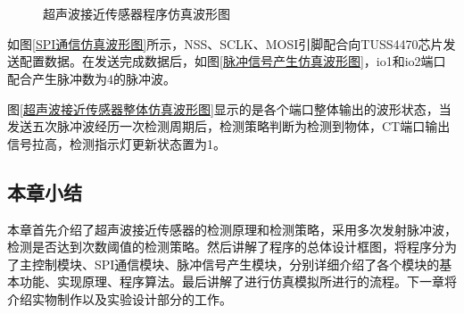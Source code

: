 \begin{figure}[ht]
	\centering
	\\
	\centering
	\\
	
	\caption{超声波接近传感器程序仿真波形图}
	\label{超声波接近传感器程序仿真波形图}
\end{figure}


如图\ref{SPI通信仿真波形图}所示，NSS、SCLK、MOSI引脚配合向TUSS4470芯片发送配置数据。在发送完成数据后，如图\ref{脉冲信号产生仿真波形图}，io1和io2端口配合产生脉冲数为4的脉冲波。\par
图\ref{超声波接近传感器整体仿真波形图}显示的是各个端口整体输出的波形状态，当发送五次脉冲波经历一次检测周期后，检测策略判断为检测到物体，CT端口输出信号拉高，检测指示灯更新状态置为1。\par
\subsection{本章小结}
本章首先介绍了超声波接近传感器的检测原理和检测策略，采用多次发射脉冲波，检测是否达到次数阈值的检测策略。然后讲解了程序的总体设计框图，将程序分为了主控制模块、SPI通信模块、脉冲信号产生模块，分别详细介绍了各个模块的基本功能、实现原理、程序算法。最后讲解了进行仿真模拟所进行的流程。下一章将介绍实物制作以及实验设计部分的工作。

